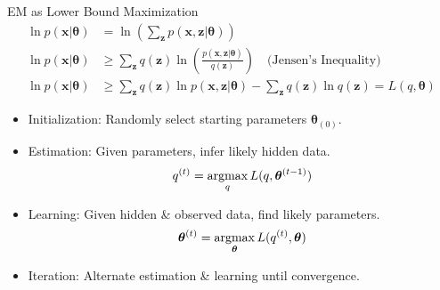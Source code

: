\documentclass[10pt,mathserif]{beamer}
\begin{document}
\begin{frame}{EM as Lower Bound Maximization}
\begin{equation*}
    \begin{split}
        \ln p(\bm{x}|\bm{\theta}) & = \ln (\sum_{\bm{z}} p(\bm{x},\bm{z}|\bm{\theta}))\\
        \ln p(\bm{x}|\bm{\theta}) & \geq \sum_{\bm{z}} q(\bm{z}) \ln (\frac{p(\bm{x},\bm{z}|\bm{\theta})}{q(\bm{z})}) \quad\text{(Jensen's Inequality)}\\
        \ln p(\bm{x}|\bm{\theta}) & \geq \sum_{\bm{z}} q(\bm{z}) \ln p(\bm{x},\bm{z}|\bm{\theta}) -\sum_{\bm{z}} q(\bm{z}) \ln q(\bm{z}) = L(q,\bm{\theta})
    \end{split}
\end{equation*}

\begin{itemize}
\item Initialization: Randomly select starting parameters $\bm{\theta}_{(0)}$.
\item Estimation: Given parameters, infer likely hidden data.
    \begin{equation*}
        q^{(t)} = \mathop{\rm argmax}_q L(q,\bm{\theta}^{(t-1)})
    \end{equation*}
\item Learning: Given hidden \& observed data, find likely parameters.
    \begin{equation*}
        \bm{\theta}^{(t)} = \mathop{\rm argmax}_{\bm{\theta}} L(q^{(t)},\bm{\theta})
    \end{equation*}
\item Iteration: Alternate estimation \& learning until convergence.
\end{itemize}
\end{frame}

\begin{frame}{Lower Bounds on Marginal Likelihood}
\begin{figure}[h]
\centering
\texttt{[image: \{Figure9.11]}.pdf}
\end{figure}
\end{frame}
\end{document}
